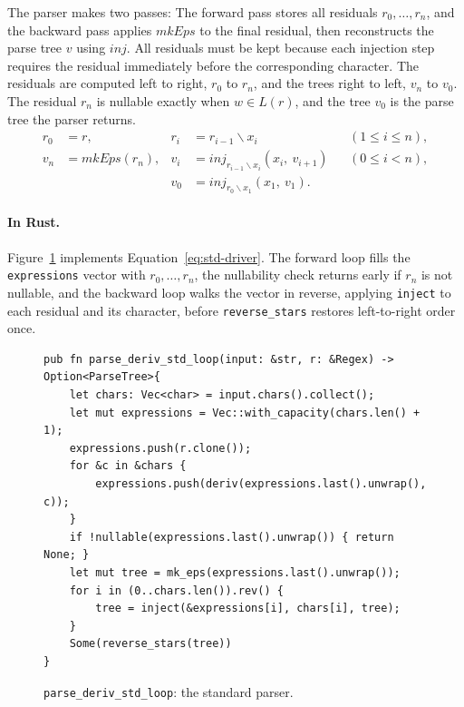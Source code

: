 The parser makes two passes: 
The forward pass stores all residuals $r_0,\ldots,r_n$, 
and the backward pass applies $\mathit{mkEps}$ to the final residual, 
then reconstructs the parse tree $v$ using $\mathit{inj}$. 
All residuals must be kept because each injection step 
requires the residual immediately before the corresponding character.
The residuals are computed left to right, $r_0$ to $r_n$, 
and the trees right to left, $v_n$ to $v_0$. 
The residual $r_n$ is nullable exactly when $w \in L(r)$, 
and the tree $v_0$ is the parse tree the parser returns.
\begin{equation}\label{eq:std-driver}
\begin{aligned}
r_0 &= r, & r_i &= r_{i-1} \backslash x_i
  &&(1 \leq i \leq n), \\
v_n &= \mathit{mkEps}(r_n), & v_i
  &= \mathit{inj}_{r_{i-1} \backslash x_i}(x_i,\ v_{i+1})
  &&(0 \leq i < n), \\
& & v_0 &= \mathit{inj}_{r_0 \backslash x_1}(x_1,\ v_1).
\end{aligned}
\end{equation}

%

\paragraph{In Rust.}
Figure~\ref{fig:deriv-std-drivers-rust} implements Equation~\eqref{eq:std-driver}.
The forward loop fills the \texttt{expressions} vector with $r_0, \ldots, r_n$, 
the nullability check returns early if $r_n$ is not nullable, 
and the backward loop walks the vector in reverse, 
applying \texttt{inject} to each residual and its character, 
before \texttt{reverse\_stars} restores left-to-right order once.
\begin{figure}[H]
\small
\begin{verbatim}
pub fn parse_deriv_std_loop(input: &str, r: &Regex) -> Option<ParseTree>{
    let chars: Vec<char> = input.chars().collect();
    let mut expressions = Vec::with_capacity(chars.len() + 1);
    expressions.push(r.clone());
    for &c in &chars {
        expressions.push(deriv(expressions.last().unwrap(), c));
    }
    if !nullable(expressions.last().unwrap()) { return None; }
    let mut tree = mk_eps(expressions.last().unwrap());
    for i in (0..chars.len()).rev() {
        tree = inject(&expressions[i], chars[i], tree);
    }
    Some(reverse_stars(tree))
}
\end{verbatim}
\caption{\texttt{parse\_deriv\_std\_loop}: the standard parser.}
\label{fig:deriv-std-drivers-rust}
\end{figure}

